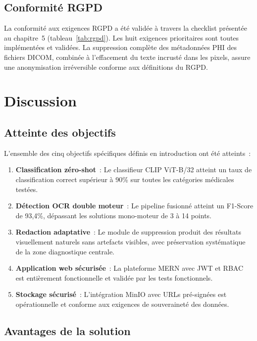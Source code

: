 \subsection{Conformité RGPD}

La conformité aux exigences RGPD a été validée à travers la checklist présentée au chapitre~5 (tableau~\ref{tab:rgpd}). Les huit exigences prioritaires sont toutes implémentées et validées. La suppression complète des métadonnées PHI des fichiers DICOM, combinée à l'effacement du texte incrusté dans les pixels, assure une anonymisation irréversible conforme aux définitions du RGPD.

\section{Discussion}

\subsection{Atteinte des objectifs}

L'ensemble des cinq objectifs spécifiques définis en introduction ont été atteints~:

\begin{enumerate}
  \item \textbf{Classification zéro-shot}~: Le classifieur CLIP ViT-B/32 atteint un taux de classification correct supérieur à 90\% sur toutes les catégories médicales testées.
  \item \textbf{Détection OCR double moteur}~: Le pipeline fusionné atteint un F1-Score de 93,4\%, dépassant les solutions mono-moteur de 3 à 14 points.
  \item \textbf{Redaction adaptative}~: Le module de suppression produit des résultats visuellement naturels sans artefacts visibles, avec préservation systématique de la zone diagnostique centrale.
  \item \textbf{Application web sécurisée}~: La plateforme MERN avec JWT et RBAC est entièrement fonctionnelle et validée par les tests fonctionnels.
  \item \textbf{Stockage sécurisé}~: L'intégration MinIO avec URLs pré-signées est opérationnelle et conforme aux exigences de souveraineté des données.
\end{enumerate}

\subsection{Avantages de la solution}

